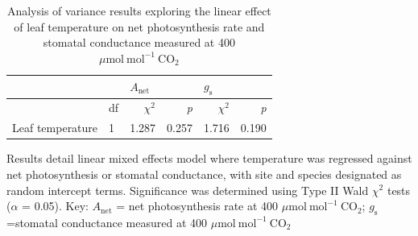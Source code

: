     \newpage
    \begin{table}[]
        \caption{Analysis of variance results exploring the linear effect of leaf temperature on net photosynthesis rate and stomatal conductance measured at 400 $\mu \mathrm{mol\ mol^{-1}\ CO_2}$}
        \centering
        \label{table:tab.b2}
        \begin{tabular}{p{4cm}p{1cm}p{3cm}p{}p{3cm}p{3cm}}
            && \multicolumn{2}{l}{$A_\mathrm{net}$} & \multicolumn{2}{l}{$g_\mathrm{s}$} \\
            \hline
            & df                    
            & \multicolumn{1}{r}{$\chi^2$}      & \multicolumn{1}{r}{\textit{p}}
            & \multicolumn{1}{r}{$\chi^2$}      & \multicolumn{1}{r}{\textit{p}}
            \\
            \hline
            
            Leaf temperature & 1    
            & \multicolumn{1}{r}{1.287}         & \multicolumn{1}{r}{0.257}      
            & \multicolumn{1}{r}{1.716}         & \multicolumn{1}{r}{0.190} \\

\end{tabular}%
\end{table}
\begin{singlespace}
\noindent Results detail linear mixed effects model where temperature was regressed against net photosynthesis or stomatal conductance, with site and species designated as random intercept terms. Significance was determined using Type II Wald $\chi^2$ tests ($\alpha$ = 0.05). Key: $A_\mathrm{net}$ = net photosynthesis rate at 400 $\mu \mathrm{mol\ mol^{-1}\ CO_2}$; $g_\mathrm{s}$=stomatal conductance measured at 400 $\mu \mathrm{mol\ mol^{-1}\ CO_2}$
\end{singlespace}
\clearpage

